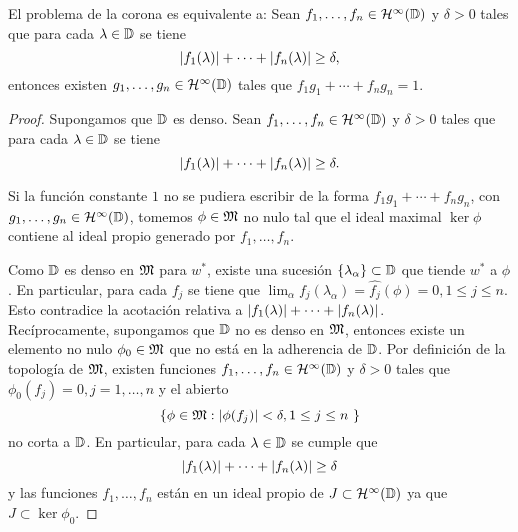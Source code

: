 \begin{theorem}
    El problema de la corona es equivalente a:
     Sean $f_1, \dots, f_n \in \mathcal{H}^{\infty}(\mathbb{D})$ y $\delta > 0$ tales que para cada $\lambda \in \mathbb{D}$ se tiene
\begin{equation*}
    \left\lvert f_1(\lambda)\right\rvert + \cdots + \left\lvert f_n(\lambda)\right\rvert \geq \delta,
\end{equation*}
     entonces existen $g_1, \dots, g_n \in \mathcal{H}^{\infty}(\mathbb{D})$ tales que $f_1 g_1 + \cdots + f_n g_n = 1$.

\end{theorem}

\begin{proof}
Supongamos que $\mathbb{D}$ es denso. Sean $f_1, \dots, f_n \in \mathcal{H}^{\infty}(\mathbb{D})$ y $\delta > 0$ tales que para cada $\lambda \in \mathbb{D}$ se tiene
\begin{equation*}
    \left\lvert f_1(\lambda)\right\rvert + \cdots + \left\lvert f_n(\lambda)\right\rvert \geq \delta.
\end{equation*}

Si la función constante $1$ no se pudiera escribir de la forma $f_1 g_1 + \cdots + f_n g_n$, con $g_1, \dots, g_n \in \mathcal{H}^{\infty}(\mathbb{D})$, tomemos $\phi \in \mathfrak{M}$ no nulo tal que el ideal maximal $\ker \phi$ contiene al ideal propio generado por $f_1, \dots, f_n$.

Como $\mathbb{D}$ es denso en $\mathfrak{M}$ para $w^*$, existe una sucesión $\{ \lambda_\alpha \} \subset \mathbb{D}$ que tiende $w^*$ a $\phi$. En particular, para cada $f_j$ se tiene que $\lim_\alpha f_j (\lambda_\alpha) = \hat{f_j} (\phi) = 0, 1 \leq j \leq n$. Esto contradice la acotación relativa a $\left\lvert f_1(\lambda)\right\rvert + \cdots + \left\lvert f_n(\lambda)\right\rvert$. \\

Recíprocamente, supongamos que $\mathbb{D}$ no es denso en $\mathfrak{M}$, entonces existe un elemento no nulo $\phi_0 \in \mathfrak{M}$ que no está en la adherencia de $\mathbb{D}$. Por definición de la topología de $\mathfrak{M}$, existen funciones $f_1, \dots, f_n \in \mathcal{H}^{\infty}(\mathbb{D})$ y $\delta > 0$ tales que $\phi_0 (f_j) = 0, j = 1, \dots, n$ y el abierto
\begin{equation*}
    \{ \phi \in \fiber : \abs{\phi (f_j)} < \delta, 1 \leq j \leq n \}
\end{equation*}
no corta a $\mathbb{D}$. En particular, para cada $\lambda \in \mathbb{D}$ se cumple que
\begin{equation*}
    \left\lvert f_1(\lambda)\right\rvert + \cdots + \left\lvert f_n(\lambda)\right\rvert \geq \delta
\end{equation*}
y las funciones $f_1, \dots, f_n$ están en un ideal propio de $J \subset \mathcal{H}^{\infty}(\mathbb{D})$ ya que $J \subset \ker \phi_0$. %


\end{proof}
